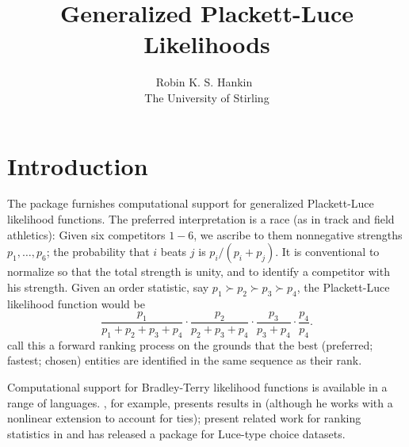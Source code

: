 \documentclass[article]{jss}
\author{Robin K. S. Hankin~\orcidlink{0000-0001-5982-0415}\\
  The University of Stirling}
\title{Generalized Plackett-Luce Likelihoods}
\begin{document}
\section{Introduction}

The  package \citep{hankin2009,hankin2017} furnishes
computational support for generalized
Plackett-Luce \citep{plackett1975} likelihood functions.  The
preferred interpretation is a race (as in track and field athletics):
Given six competitors $1-6$, we ascribe to them nonnegative strengths
$p_1,\ldots, p_6$; the probability that $i$ beats $j$ is
$p_i/(p_i+p_j)$.  It is conventional to normalize so that the total
strength is unity, and to identify a competitor with his strength.
Given an order statistic, say $p_1\succ p_2\succ p_3\succ p_4$, the
Plackett-Luce likelihood function would be
%
\begin{equation}\label{PL_like}
  \frac{p_1}{p_1+p_2+p_3+p_4}\cdot
  \frac{p_2}{    p_2+p_3+p_4}\cdot
  \frac{p_3}{        p_3+p_4}\cdot
  \frac{p_4}{            p_4}.
\end{equation}
%
\citet{mollica2014} call this a forward ranking process on the grounds
that the best (preferred; fastest; chosen) entities are identified in
the same sequence as their rank.  

Computational support for Bradley-Terry likelihood functions is
available in a range of languages.  \cite{hunter2004}, for example,
presents results in  (although he works with a
nonlinear extension to account for ties); \cite{allison1994} present
related work for ranking statistics in  and
\cite{maystre2022} has released a  package for
Luce-type choice datasets.
\end{document}
